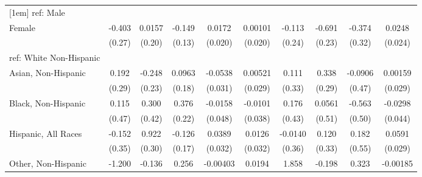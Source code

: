 \begin{table}[htbp]
\begin{tabular}{l*{9}{c}}
[1em]
ref: Male&                     &                     &                     &                     &                     &                     &                     &                     &                     \\
[1em]
Female&      -0.403         &      0.0157         &      -0.149         &      0.0172         &     0.00101         &      -0.113         &      -0.691\sym{***}&      -0.374         &      0.0248         \\
  &      (0.27)         &      (0.20)         &      (0.13)         &     (0.020)         &     (0.020)         &      (0.24)         &      (0.23)         &      (0.32)         &     (0.024)         \\
[1em]
ref: White Non-Hispanic&                     &                     &                     &                     &                     &                     &                     &                     &                     \\
[1em]
Asian, Non-Hispanic&       0.192         &      -0.248         &      0.0963         &     -0.0538\sym{*}  &     0.00521         &       0.111         &       0.338         &     -0.0906         &     0.00159         \\
  &      (0.29)         &      (0.23)         &      (0.18)         &     (0.031)         &     (0.029)         &      (0.33)         &      (0.29)         &      (0.47)         &     (0.029)         \\
[1em]
Black, Non-Hispanic&       0.115         &       0.300         &       0.376         &     -0.0158         &     -0.0101         &       0.176         &      0.0561         &      -0.563         &     -0.0298         \\
  &      (0.47)         &      (0.42)         &      (0.22)         &     (0.048)         &     (0.038)         &      (0.43)         &      (0.51)         &      (0.50)         &     (0.044)         \\
[1em]
Hispanic, All Races&      -0.152         &       0.922\sym{***}&      -0.126         &      0.0389         &      0.0126         &     -0.0140         &       0.120         &       0.182         &      0.0591\sym{*}  \\
  &      (0.35)         &      (0.30)         &      (0.17)         &     (0.032)         &     (0.032)         &      (0.36)         &      (0.33)         &      (0.55)         &     (0.029)         \\
[1em]
Other, Non-Hispanic&      -1.200         &      -0.136         &       0.256         &    -0.00403         &      0.0194         &       1.858\sym{**} &      -0.198         &       0.323         &    -0.00185         \\

\end{tabular}
\end{table}
